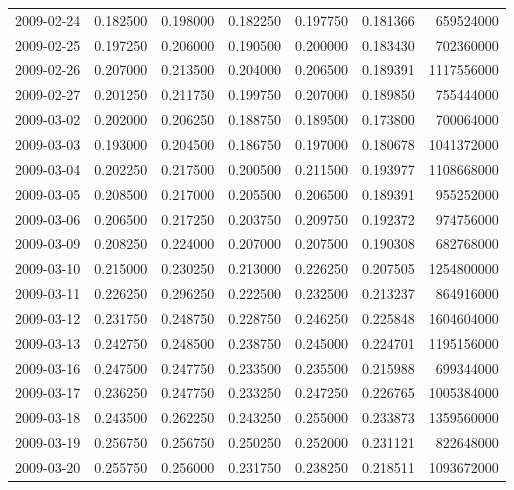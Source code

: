 \begin{tabular}{lrrrrrr}
2009-02-24 &    0.182500 &    0.198000 &    0.182250 &    0.197750 &    0.181366 &   659524000 \\
2009-02-25 &    0.197250 &    0.206000 &    0.190500 &    0.200000 &    0.183430 &   702360000 \\
2009-02-26 &    0.207000 &    0.213500 &    0.204000 &    0.206500 &    0.189391 &  1117556000 \\
2009-02-27 &    0.201250 &    0.211750 &    0.199750 &    0.207000 &    0.189850 &   755444000 \\
2009-03-02 &    0.202000 &    0.206250 &    0.188750 &    0.189500 &    0.173800 &   700064000 \\
2009-03-03 &    0.193000 &    0.204500 &    0.186750 &    0.197000 &    0.180678 &  1041372000 \\
2009-03-04 &    0.202250 &    0.217500 &    0.200500 &    0.211500 &    0.193977 &  1108668000 \\
2009-03-05 &    0.208500 &    0.217000 &    0.205500 &    0.206500 &    0.189391 &   955252000 \\
2009-03-06 &    0.206500 &    0.217250 &    0.203750 &    0.209750 &    0.192372 &   974756000 \\
2009-03-09 &    0.208250 &    0.224000 &    0.207000 &    0.207500 &    0.190308 &   682768000 \\
2009-03-10 &    0.215000 &    0.230250 &    0.213000 &    0.226250 &    0.207505 &  1254800000 \\
2009-03-11 &    0.226250 &    0.296250 &    0.222500 &    0.232500 &    0.213237 &   864916000 \\
2009-03-12 &    0.231750 &    0.248750 &    0.228750 &    0.246250 &    0.225848 &  1604604000 \\
2009-03-13 &    0.242750 &    0.248500 &    0.238750 &    0.245000 &    0.224701 &  1195156000 \\
2009-03-16 &    0.247500 &    0.247750 &    0.233500 &    0.235500 &    0.215988 &   699344000 \\
2009-03-17 &    0.236250 &    0.247750 &    0.233250 &    0.247250 &    0.226765 &  1005384000 \\
2009-03-18 &    0.243500 &    0.262250 &    0.243250 &    0.255000 &    0.233873 &  1359560000 \\
2009-03-19 &    0.256750 &    0.256750 &    0.250250 &    0.252000 &    0.231121 &   822648000 \\
2009-03-20 &    0.255750 &    0.256000 &    0.231750 &    0.238250 &    0.218511 &  1093672000 \\

\end{tabular}
